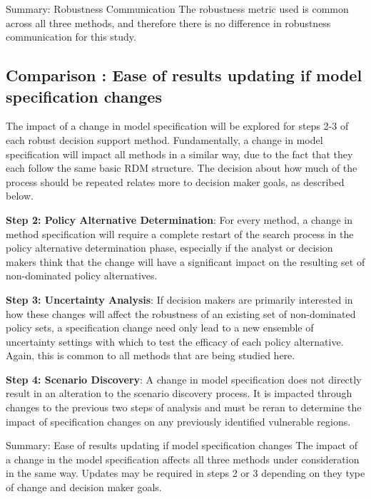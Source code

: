    \begin{comparisonbox}{Summary: Robustness Communication}
        The robustness metric used is common across all three methods, and therefore there is no difference in robustness communication for this study. 
    \end{comparisonbox}

    \subsection{Comparison \thecomparison : Ease of results updating if model specification changes} 
    The impact of a change in model specification will be explored for steps 2-3 of each robust decision support method. Fundamentally, a change in model specification will impact all methods in a similar way, due to the fact that they each follow the same basic RDM structure. The decision about how much of the process should be repeated relates more to decision maker goals, as described below. 
    
    \textbf{Step 2: Policy Alternative Determination}: For every method, a change in method specification will require a complete restart of the search process in the policy alternative determination phase, especially if the analyst or decision makers think that the change will have a significant impact on the resulting set of non-dominated policy alternatives. 
    
    \textbf{Step 3: Uncertainty Analysis}: If decision makers are primarily interested in how these changes will affect the robustness of an existing set of non-dominated policy sets, a specification change need only lead to a new ensemble of uncertainty settings with which to test the efficacy of each policy alternative. Again, this is common to all methods that are being studied here.
    
    \textbf{Step 4: Scenario Discovery}: A change in model specification does not directly result in an alteration to the scenario discovery process. It is impacted through changes to the previous two steps of analysis and must be reran to determine the impact of specification changes on any previously identified vulnerable regions.
    
    \begin{comparisonbox}{Summary: Ease of results updating if model specification changes}
         The impact of a change in the model specification affects all three methods under consideration in the same way. Updates may be required in steps 2 or 3 depending on they type of change and decision maker goals.
    \end{comparisonbox}
    
